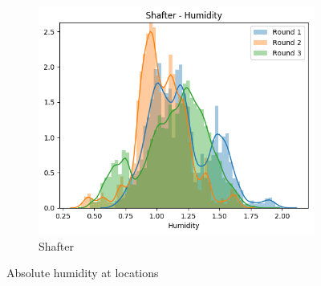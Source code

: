 \documentclass[journal abbreviation, manuscript]{copernicus}
\begin{document}
\begin{figure}[H]
\begin{subfigure}{0.32\textwidth}
\includegraphics[width=\textwidth]{results/distributions/location_shafter_humidity.png}
\caption{Shafter}
\end{subfigure}
\caption{Absolute humidity at locations}
\label{fig:humidity-locations}
\end{figure}
\end{document}
